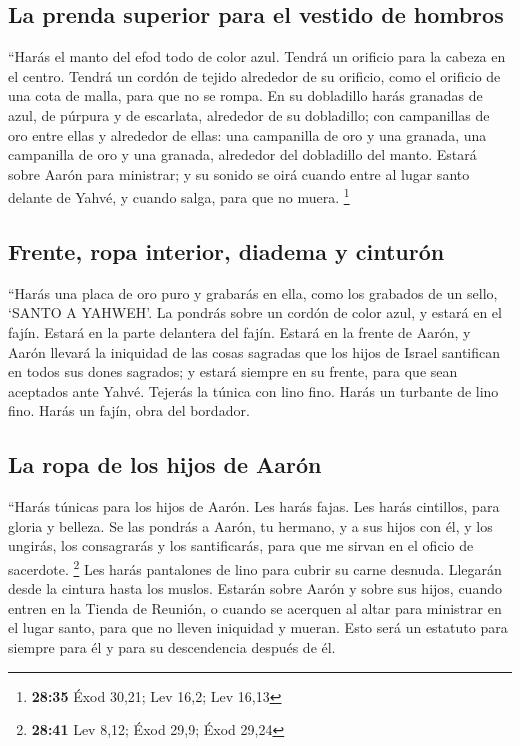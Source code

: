 \hypertarget{la-prenda-superior-para-el-vestido-de-hombros}{%
\subsection{La prenda superior para el vestido de
hombros}\label{la-prenda-superior-para-el-vestido-de-hombros}}

 ``Harás el manto del efod todo de color azul.
 Tendrá un orificio para la cabeza en el centro. Tendrá
un cordón de tejido alrededor de su orificio, como el orificio de una
cota de malla, para que no se rompa.  En su dobladillo
harás granadas de azul, de púrpura y de escarlata, alrededor de su
dobladillo; con campanillas de oro entre ellas y alrededor de ellas:
 una campanilla de oro y una granada, una campanilla de
oro y una granada, alrededor del dobladillo del manto. 
Estará sobre Aarón para ministrar; y su sonido se oirá cuando entre al
lugar santo delante de Yahvé, y cuando salga, para que no muera.
\footnote{\textbf{28:35} Éxod 30,21; Lev 16,2; Lev 16,13}

\hypertarget{frente-ropa-interior-diadema-y-cinturuxf3n}{%
\subsection{Frente, ropa interior, diadema y
cinturón}\label{frente-ropa-interior-diadema-y-cinturuxf3n}}

 ``Harás una placa de oro puro y grabarás en ella, como
los grabados de un sello, `SANTO A YAHWEH'.  La pondrás
sobre un cordón de color azul, y estará en el fajín. Estará en la parte
delantera del fajín.  Estará en la frente de Aarón, y
Aarón llevará la iniquidad de las cosas sagradas que los hijos de Israel
santifican en todos sus dones sagrados; y estará siempre en su frente,
para que sean aceptados ante Yahvé.  Tejerás la túnica
con lino fino. Harás un turbante de lino fino. Harás un fajín, obra del
bordador.

\hypertarget{la-ropa-de-los-hijos-de-aaruxf3n}{%
\subsection{La ropa de los hijos de
Aarón}\label{la-ropa-de-los-hijos-de-aaruxf3n}}

 ``Harás túnicas para los hijos de Aarón. Les harás
fajas. Les harás cintillos, para gloria y belleza.  Se
las pondrás a Aarón, tu hermano, y a sus hijos con él, y los ungirás,
los consagrarás y los santificarás, para que me sirvan en el oficio de
sacerdote. \footnote{\textbf{28:41} Lev 8,12; Éxod 29,9; Éxod 29,24}
 Les harás pantalones de lino para cubrir su carne
desnuda. Llegarán desde la cintura hasta los muslos. 
Estarán sobre Aarón y sobre sus hijos, cuando entren en la Tienda de
Reunión, o cuando se acerquen al altar para ministrar en el lugar santo,
para que no lleven iniquidad y mueran. Esto será un estatuto para
siempre para él y para su descendencia después de él.


